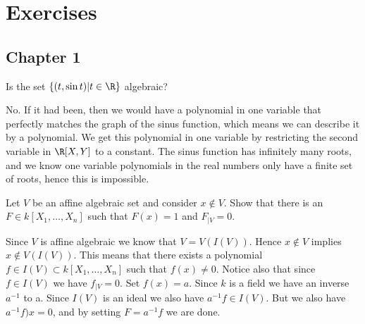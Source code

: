 
\section{Exercises}

\subsection{Chapter 1}
\label{ex:chap_1}


\begin{problem}[1.1]
Is the set $\{ (t, \sin t) \vert t\in \R\}$ algebraic?

\begin{solution}
No. If it had been, then we would have a polynomial in one variable that perfectly matches the graph of the sinus function, which means we can describe it by a polynomial. We get this polynomial in one variable by restricting the second variable in $\R[X, Y]$ to a constant. The sinus function has infinitely many roots, and we know one variable polynomials in the real numbers only have a finite set of roots, hence this is impossible. 
\end{solution}
\end{problem}


\begin{problem}[1.2]
Let $V$ be an affine algebraic set and consider $x\notin V$. Show that there is an $F\in k[X_1, \ldots, X_n]$ such that $F(x)=1$ and $F_{\vert V} =0$.

\begin{solution}
Since $V$ is affine algebraic we know that $V=V(I(V))$. Hence $x\notin V$ implies $x\notin V(I(V))$. This means that there exists a polynomial $f\in I(V)\subset k[X_1,\ldots, X_n]$ such that $f(x)\neq 0$. Notice also that since $f\in I(V)$ we have $f_{\vert V}=0$. Set $f(x)=a$. Since $k$ is a field we have an inverse $a^{-1}$ to a. Since $I(V)$ is an ideal we also have $a^{-1}f \in I(V)$. But we also have $a^{-1}f)x=0$, and by setting $F=a^{-1}f$ we are done.
\end{solution}
\end{problem}



